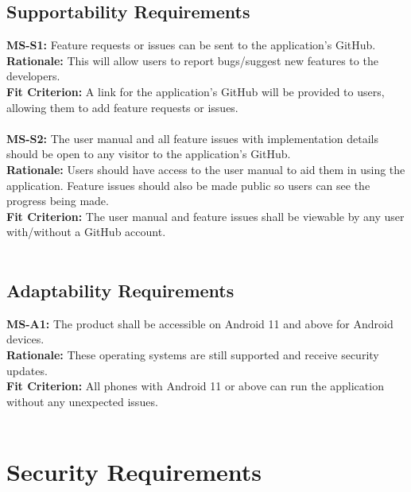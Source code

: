 \documentclass[12pt]{article}
\begin{document}
\subsection{Supportability Requirements}
  \textbf{MS-S1:} Feature requests or issues can be sent to the application's GitHub.\\
  \textbf{Rationale:} This will allow users to report bugs/suggest new features to the developers.\\
  \textbf{Fit Criterion:} A link for the application's GitHub will be provided to users, allowing them to add feature requests or issues.\\\\
  \textbf{MS-S2:} The user manual and all feature issues with implementation details should be open to any visitor to the application's GitHub.\\
  \textbf{Rationale:} Users should have access to the user manual to aid them in using the application. Feature issues should also be made public so users can see the progress being made.\\
  \textbf{Fit Criterion:} The user manual and feature issues shall be viewable by any user with/without a GitHub account.\\\\

\subsection{Adaptability Requirements}
  \textbf{MS-A1:} The product shall be accessible on Android 11 and above for Android devices.\\
  \textbf{Rationale:} These operating systems are still supported and receive security updates.\\
  \textbf{Fit Criterion:} All phones with Android 11 or above can run the application without any unexpected issues.\\\\

\section{Security Requirements}
\end{document}
